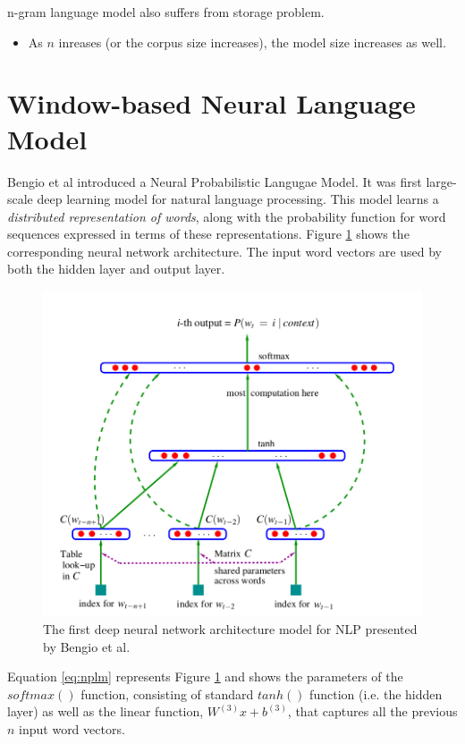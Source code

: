 \documentclass[letterpaper]{article}
\begin{document}
n-gram language model also suffers from storage problem.
\begin{itemize}
	\item As $n$ inreases (or the corpus size increases), the model size increases
	as well.
\end{itemize}

\section{Window-based Neural Language Model}
Bengio et al introduced a Neural Probabilistic Langugae Model. It was
first large-scale deep learning model for natural language processing.
This model learns a \textit{distributed representation of words}, along
with the probability function for word sequences expressed in terms of
these representations. Figure \ref{fig:nplm} shows the corresponding
neural network architecture. The input word vectors are used by both
the hidden layer and output layer.


\begin{figure}[ht]
	\includegraphics[scale=0.3]{images/Neural_Language_Model.png}
	\caption{The first deep neural network architecture model
	for NLP presented by Bengio et al.}
	\label{fig:nplm}
\end{figure}


Equation \ref{eq:nplm} represents Figure \ref{fig:nplm} and shows the
parameters of the $softmax()$ function, consisting of standard $tanh()$
function (i.e. the hidden layer) as well as the linear function, 
$W^{(3)}x + b^{(3)}$, that captures all the previous $n$ input word vectors.
\end{document}
